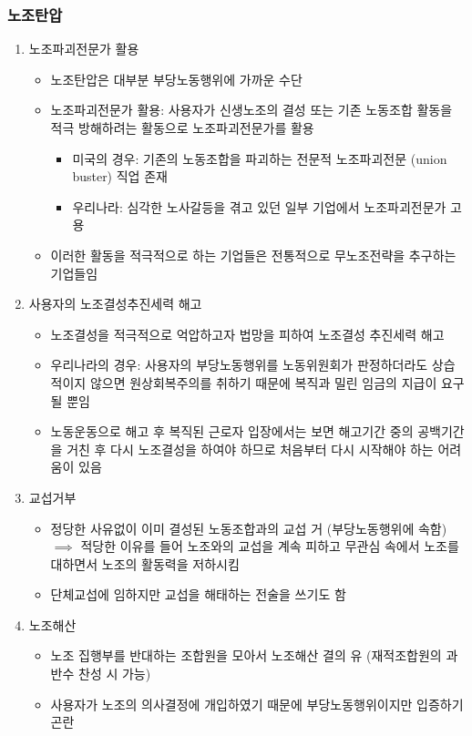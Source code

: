 \documentclass[aspectratio=169,xcolor=dvipsnames,handout]{beamer}
\begin{document}
\begin{frame}[allowframebreaks]
    \frametitle{노조탄압}
    \begin{enumerate}[<+->]
        \item 노조파괴전문가 활용
        \begin{itemize}
        \item 노조탄압은 대부분 부당노동행위에 가까운 수단
            \item 노조파괴전문가 활용: 사용자가 신생노조의 결성 또는 기존 노동조합 활동을 적극 방해하려는 활동으로 노조파괴전문가를 활용
            \begin{itemize}
                \item 미국의 경우: 기존의 노동조합을 파괴하는 전문적 노조파괴전문 (union buster) 직업 존재
                \item 우리나라: 심각한 노사갈등을 겪고 있던 일부 기업에서 노조파괴전문가 고용
            \end{itemize}
            \item 이러한 활동을 적극적으로 하는 기업들은 전통적으로 무노조전략을 추구하는 기업들임
        \end{itemize}
        \framebreak%
        \item 사용자의 노조결성추진세력 해고
        \begin{itemize}
            \item 노조결성을 적극적으로 억압하고자 법망을 피하여 노조결성 추진세력 해고
            \item 우리나라의 경우: 사용자의 부당노동행위를 노동위원회가 판정하더라도 상습적이지 않으면 원상회복주의를 취하기 때문에 복직과 밀린 임금의 지급이 요구될 뿐임
            \item 노동운동으로 해고 후 복직된 근로자 입장에서는 보면 해고기간 중의 공백기간을 거친 후 다시 노조결성을 하여야 하므로 처음부터 다시 시작해야 하는 어려움이 있음
        \end{itemize}
        \framebreak%
        \item 교섭거부
        \begin{itemize}
            \item 정당한 사유없이 이미 결성된 노동조합과의 교섭 거 (부당노동행위에 속함) $\implies$ 적당한 이유를 들어 노조와의 교섭을 계속 피하고 무관심 속에서 노조를 대하면서 노조의 활동력을 저하시킴
            \item 단체교섭에 임하지만 교섭을 해태하는 전술을 쓰기도 함
        \end{itemize}
        \item 노조해산
        \begin{itemize}
            \item 노조 집행부를 반대하는 조합원을 모아서 노조해산 결의 유 (재적조합원의 과반수 찬성 시 가능)
            \item 사용자가 노조의 의사결정에 개입하였기 때문에 부당노동행위이지만 입증하기 곤란
        \end{itemize}
    \end{enumerate}
\end{frame}
\end{document}
